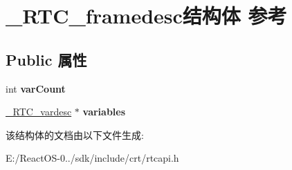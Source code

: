 \hypertarget{struct___r_t_c__framedesc}{}\section{\+\_\+\+R\+T\+C\+\_\+framedesc结构体 参考}
\label{struct___r_t_c__framedesc}
\subsection*{Public 属性}
\begin{DoxyCompactItemize}
\item 
\mbox{\label{struct___r_t_c__framedesc_a38657fc8dff60c005dfa253cd1e3c2c9}} 
int {\bfseries var\+Count}
\item 
\mbox{\label{struct___r_t_c__framedesc_ae32ddea7fe8321c18776e6f57f7af541}} 
\hyperlink{struct___r_t_c__vardesc}{\+\_\+\+R\+T\+C\+\_\+vardesc} $\ast$ {\bfseries variables}
\end{DoxyCompactItemize}


该结构体的文档由以下文件生成\+:\begin{DoxyCompactItemize}
\item 
E\+:/\+React\+O\+S-\/0../sdk/include/crt/rtcapi.\+h\end{DoxyCompactItemize}
